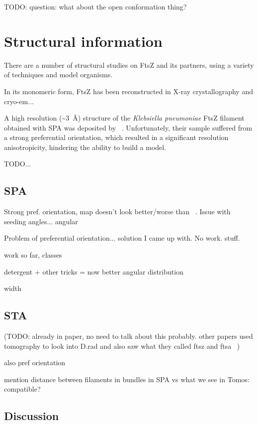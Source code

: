 TODO: question: what about the open conformation thing?

\section{Structural information}

There are a number of structural studies on FtsZ and its partners, using a variety of techniques and model organisms.

In its monomeric form, FtsZ has been reconstructed in X-ray crystallography and cryo-em...

A high resolution (\sim\qty{3}{\angstrom}) structure of the \textit{Klebsiella pneumoniae} FtsZ filament obtained with SPA was deposited by ~\citet{fujitaStructuresFtsZSingle2023}.
Unfortunately, their sample suffered from a strong preferential orientation, which resulted in a significant resolution anisotropicity, hindering the ability to build a model.

TODO...

\subsection{SPA}

Strong pref. orientation, map doesn't look better/worse than ~\citet{fujitaStructuresFtsZSingle2023}.
Issue with seeding angles... angular

Problem of preferential orientation... solution I came up with. No work. stuff.

work so far, classes

detergent + other tricks = now better angular distribution

width

\subsection{STA}

(TODO: already in paper, no need to talk about this probably. other papers used tomography to look into D.rad and also saw what they called ftsz and ftsa ~\cite{sextonSuperresolutionConfocalCryoCLEM2022})

also pref orientation

mention distance between filaments in bundles in SPA vs what we see in Tomos: compatible?

\subsection{Discussion}

